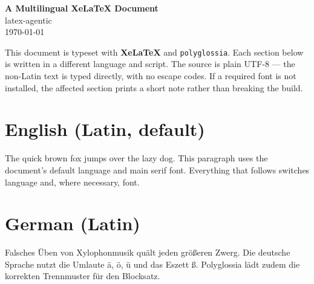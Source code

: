 \documentclass[11pt,a4paper]{article}
\begin{document}
\begin{center}
  {\LARGE\bfseries A Multilingual XeLaTeX Document}\\[4pt]
  {\large latex-agentic}\\[2pt]
  {\today}
\end{center}
\vspace{1.2em}

\noindent This document is typeset with \textbf{XeLaTeX} and
\texttt{polyglossia}. Each section below is written in a different language and
script. The source is plain UTF-8 — the non-Latin text is typed directly, with
no escape codes. If a required font is not installed, the affected section
prints a short note rather than breaking the build.

\section*{English (Latin, default)}
The quick brown fox jumps over the lazy dog. This paragraph uses the document's
default language and main serif font. Everything that follows switches language
and, where necessary, font.

\section*{German (Latin)}
\begin{german}
Falsches Üben von Xylophonmusik quält jeden größeren Zwerg. Die deutsche
Sprache nutzt die Umlaute ä, ö, ü und das Eszett ß. Polyglossia lädt zudem die
korrekten Trennmuster für den Blocksatz.
\end{german}

\end{document}
